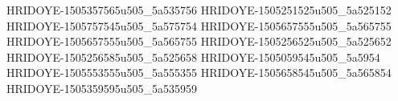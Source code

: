 HRIDOYE-1505357565u505_5a535756
HRIDOYE-1505251525u505_5a525152
HRIDOYE-1505757545u505_5a575754
HRIDOYE-1505657555u505_5a565755
HRIDOYE-1505657555u505_5a565755
HRIDOYE-1505256525u505_5a525652
HRIDOYE-1505256585u505_5a525658
HRIDOYE-1505059545u505_5a5954
HRIDOYE-1505553555u505_5a555355
HRIDOYE-1505658545u505_5a565854
HRIDOYE-1505359595u505_5a535959

